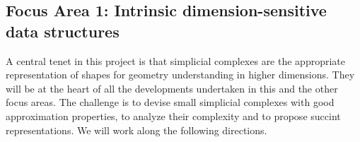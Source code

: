 \subsection*{Focus Area 1:  Intrinsic dimension-sensitive data structures} 

A central tenet in this project is that simplicial complexes are the appropriate representation of shapes for geometry understanding in higher dimensions.  They will be at the heart of all the developments undertaken in this and the other focus areas.  The challenge is to devise small simplicial complexes with good approximation properties, to analyze their complexity and to propose succint representations. We will work along the following directions.






